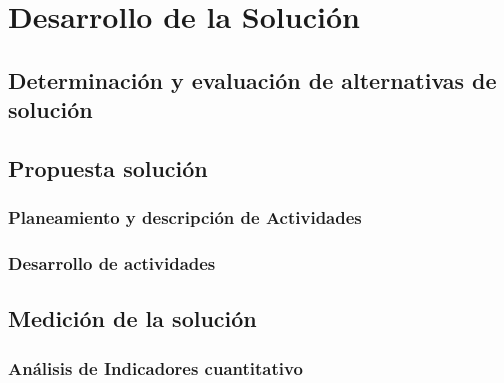 \chapter{Desarrollo de la Solución}

\section{Determinación y evaluación de alternativas de solución}

\section{Propuesta solución}

\subsection{Planeamiento y descripción de Actividades}

\subsection{Desarrollo de actividades}

\section{Medición de la solución}

\subsection{Análisis de Indicadores cuantitativo}

